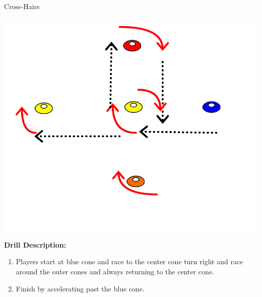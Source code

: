 
\begin{oddBlock}{Cross-Hairs}

\begin{minipage}[t]{\linewidth}
    \centering
    
    \begin{minipage}{.2\linewidth} %
        
        \centering
        \includegraphics[width=\textwidth]{../img/Trimmed/cross_hairs}

    \end{minipage}
    \hspace{0.05\linewidth}
    \begin{minipage}{.7\linewidth} %
        \textbf{Drill Description:}
        
        \begin{enumerate}
        \setlength{\itemsep}{0pt}
        \setlength{\parskip}{0pt}
        \setlength{\parsep}{0pt}
        \item Players start at blue cone and race to the center cone turn right and race around the outer cones and always returning to the center cone.
        \item Finish by accelerating past the blue cone.
        \end{enumerate}
    \end{minipage}
\end{minipage}
%

\end{oddBlock}